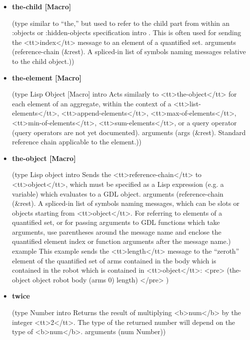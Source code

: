 \documentclass [11pt]{book}
\begin{document}
\begin{itemize}
\item {}
\label{prim:the-child}
\textbf{the-child [Macro]}

(type
 similar to ``the,'' but used to refer to the child part from within an :objects or :hidden-objects specification
 intro .
This is often used for sending the <tt>index</tt> message to an element of a quantified set.
 arguments
 (reference-chain
  (\&rest). A spliced-in list of symbols naming messages relative to the child object.))



\item {}
\label{prim:the-element}
\textbf{the-element [Macro]}

(type Lisp Object [Macro] intro
  Acts similarly to <tt>the-object</tt> for each element of an aggregate,
within the context of a <tt>list-elements</tt>, <tt>append-elements</tt>, <tt>max-of-elements</tt>,
<tt>min-of-elements</tt>, <tt>sum-elements</tt>, or a query operator (query operators are not
yet documented).
 arguments
 (args (\&rest). Standard reference chain applicable to the element.))



\item {}
\label{prim:the-object}
\textbf{the-object [Macro]}

(type Lisp object intro
  Sends the <tt>reference-chain</tt> to <tt>object</tt>, which must be specified
as a Lisp expression (e.g. a variable) which evaluates to a GDL object.
 arguments
 (reference-chain
  (\&rest). A spliced-in list of symbols naming messages, which can 
be slots or objects starting from <tt>object</tt>. For referring to elements of a quantified set,
or for passing arguments to GDL functions which take arguments, use parentheses around the
message name and enclose the quantified element index or function arguments after the message
name.)
 example 
This example sends the <tt>length</tt> message to the ``zeroth'' element of the quantified
set of arms contained in the body which is contained in the robot which is contained in <tt>object</tt>:
<pre>
 (the-object object robot body (arms 0) length)
</pre>
)



\item {}
\label{prim:twice}
\textbf{twice}

(type Number intro
  Returns the result of multiplying <b>num</b> by the integer <tt>2</tt>.
The type of the returned number will depend on the type of <b>num</b>.
 arguments (num Number))




\end{itemize}
\end{document}
